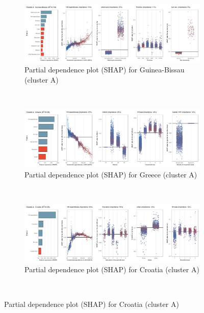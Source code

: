 \begin{figure}[ht!]\ContinuedFloat
    \centering
   \begin{subfigure}[b]{\textwidth}
   \centering
         \caption{Partial dependence plot (SHAP) for Guinea-Bissau (cluster A)}
         \label{fig:5b_GNB}
         \includegraphics[width=\textwidth]{Figure 5b/Figure_5b_GNB}
         \end{subfigure}
    \\
    \vspace{0.5cm}
    \begin{subfigure}[b]{\textwidth}
   \centering
         \caption{Partial dependence plot (SHAP) for Greece (cluster A)}
         \label{fig:5b_GRC}
         \includegraphics[width=\textwidth]{Figure 5b/Figure_5b_GRC}
         \end{subfigure}
    \\
    \vspace{0.5cm}
   \begin{subfigure}[b]{\textwidth}
   \centering
         \caption{Partial dependence plot (SHAP) for Croatia (cluster A)}
         \label{fig:5b_HRV}
         \includegraphics[width=\textwidth]{Figure 5b/Figure_5b_HRV}     
     \end{subfigure}
    \\
    \vspace{0.5cm}
   

\end{figure}
